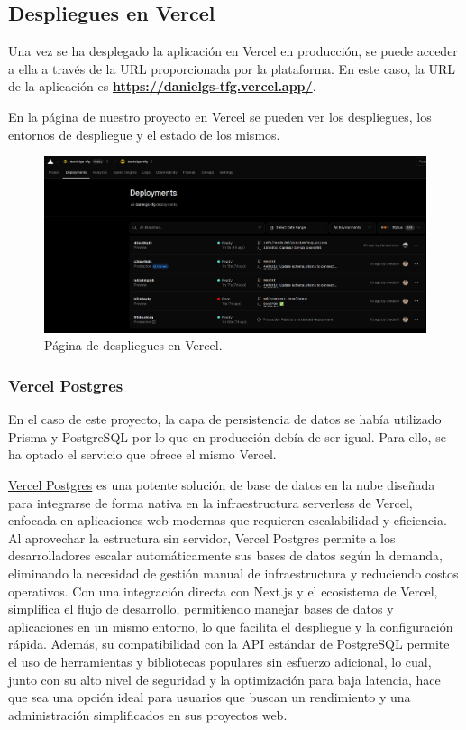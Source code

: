 \subsection{Despliegues en Vercel}

Una vez se ha desplegado la aplicación en Vercel en producción, se puede acceder a ella a través de la URL proporcionada por la plataforma. En este caso, la URL de la aplicación es \textbf{\href{https://danielgs-tfg.vercel.app/}{https://danielgs-tfg.vercel.app/}}.

En la página de nuestro proyecto en Vercel se pueden ver los despliegues, los entornos de despliegue y el estado de los mismos.

\begin{figure}[H]
    \caption{Página de despliegues en Vercel.}
    \centering
    \vspace*{0.5cm}
    \includegraphics[scale=0.2]{figuras/despliegues_vercel.png}
\end{figure}

\subsubsection{Vercel Postgres}

En el caso de este proyecto, la capa de persistencia de datos se había utilizado Prisma y PostgreSQL por lo que en producción debía de ser igual. Para ello, se ha optado el servicio que ofrece el mismo Vercel.

\href{https://vercel.com/docs/storage/vercel-postgres}{Vercel Postgres} es una potente solución de base de datos en la nube diseñada para integrarse de forma nativa en la infraestructura serverless de Vercel, enfocada en aplicaciones web modernas que requieren escalabilidad y eficiencia. Al aprovechar la estructura sin servidor, Vercel Postgres permite a los desarrolladores escalar automáticamente sus bases de datos según la demanda, eliminando la necesidad de gestión manual de infraestructura y reduciendo costos operativos. Con una integración directa con Next.js y el ecosistema de Vercel, simplifica el flujo de desarrollo, permitiendo manejar bases de datos y aplicaciones en un mismo entorno, lo que facilita el despliegue y la configuración rápida. Además, su compatibilidad con la API estándar de PostgreSQL permite el uso de herramientas y bibliotecas populares sin esfuerzo adicional, lo cual, junto con su alto nivel de seguridad y la optimización para baja latencia, hace que sea una opción ideal para usuarios que buscan un rendimiento y una administración simplificados en sus proyectos web.